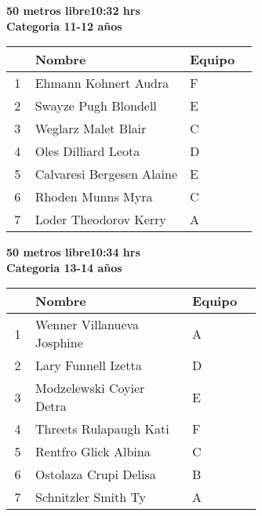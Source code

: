 \begin{minipage}{0.95\linewidth}\vspace{0.5cm} 
\begin{flushleft}
\textbf{
\hspace{-0.15cm}50 metros libre\hspace{1.5cm}10:32 hrs \\Categoria 11-12 años}\vspace{-0.2cm} 
\end{flushleft}
\begin{tabular}{cp{0.63\linewidth}l}
\hline
& \textbf{Nombre} & \textbf{Equipo} \\ \hline
1 & Ehmann Kohnert Audra & F \\ 
2 & Swayze Pugh Blondell & E \\ 
3 & Weglarz Malet Blair & C \\ 
4 & Oles Dilliard Leota & D \\ 
5 & Calvaresi Bergesen Alaine & E \\ 
6 & Rhoden Munns Myra & C \\ 
7 & Loder Theodorov Kerry & A \\ 
\end{tabular}
\end{minipage}
\begin{minipage}{0.95\linewidth}\vspace{0.5cm} 
\begin{flushleft}
\textbf{
\hspace{-0.15cm}50 metros libre\hspace{1.5cm}10:34 hrs \\Categoria 13-14 años}\vspace{-0.2cm} 
\end{flushleft}
\begin{tabular}{cp{0.63\linewidth}l}
\hline
& \textbf{Nombre} & \textbf{Equipo} \\ \hline
1 & Wenner Villanueva Josphine & A \\ 
2 & Lary Funnell Izetta & D \\ 
3 & Modzelewski Coyier Detra & E \\ 
4 & Threets Rulapaugh Kati & F \\ 
5 & Rentfro Glick Albina & C \\ 
6 & Ostolaza Crupi Delisa & B \\ 
7 & Schnitzler Smith Ty & A \\ 
\end{tabular}
\end{minipage}

